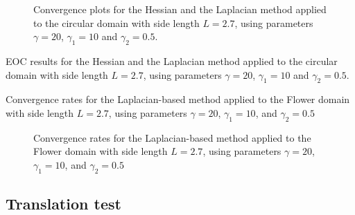 \begin{figure}[h!]
\centering
\subfloat[Hessian]{}
\subfloat[Laplace]{}

\caption{ Convergence plots for the Hessian and the Laplacian method applied to the circular domain with side length $L=2.7$, using parameters $\gamma=20$, $\gamma_1=10$ and $\gamma_2= 0.5$.}
\label{fig:conv_hes_lap}
\end{figure}



\begin{table}

\begin{minipage}{1.0\textwidth}
    \centering
    \subfloat[Hessian]{}
\end{minipage}%

\bigskip
\begin{minipage}{1.0\textwidth}
    \centering
    \subfloat[Laplace]{}
\end{minipage}
\caption{EOC results for the Hessian and the Laplacian method applied to the circular domain with side length $L=2.7$, using parameters $\gamma=20$, $\gamma_1=10$ and $\gamma_2= 0.5$.}
\label{tab:conv_hes_lap}
\end{table}


\begin{table} 
\caption{Convergence rates for the Laplacian-based method applied to the Flower domain with side length $L=2.7$, using parameters $\gamma=20$, $\gamma_1=10$, and $\gamma_2= 0.5$}
\label{tab:conv_flower_lap}
\end{table}
\begin{figure}[h!]
    \centering

\caption{Convergence rates for the Laplacian-based method applied to the Flower domain with side length $L=2.7$, using parameters $\gamma=20$, $\gamma_1=10$, and $\gamma_2= 0.5$}
\label{fig:conv_flower_lap}
\end{figure}


\newpage
\subsection{Translation test}%
\label{ssub:translation_test}

